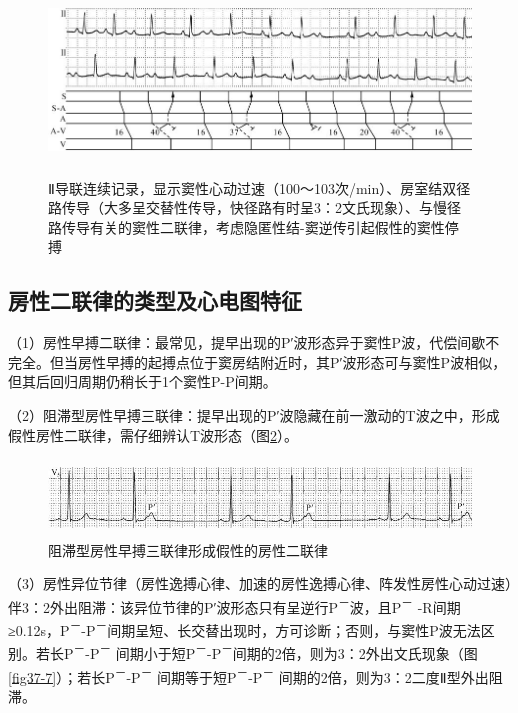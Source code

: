 \begin{figure}[!htbp]
 \centering
 \includegraphics[width=5.84375in,height=1.96875in]{./images/Image00599.jpg}
 \captionsetup{justification=centering}
 \caption{Ⅱ导联连续记录，显示窦性心动过速（100～103次/min）、房室结双径路传导（大多呈交替性传导，快径路有时呈3：2文氏现象）、与慢径路传导有关的窦性二联律，考虑隐匿性结-窦逆传引起假性的窦性停搏}
 \label{fig37-5}
  \end{figure} 

\protect\hypertarget{text00044.htmlux5cux23subid483}{}{}

\subsection{房性二联律的类型及心电图特征}

（1）房性早搏二联律：最常见，提早出现的P′波形态异于窦性P波，代偿间歇不完全。但当房性早搏的起搏点位于窦房结附近时，其P′波形态可与窦性P波相似，但其后回归周期仍稍长于1个窦性P-P间期。

（2）阻滞型房性早搏三联律：提早出现的P′波隐藏在前一激动的T波之中，形成假性房性二联律，需仔细辨认T波形态（图\ref{fig37-6}）。

\begin{figure}[!htbp]
 \centering
 \includegraphics[width=5.58333in,height=0.80208in]{./images/Image00600.jpg}
 \captionsetup{justification=centering}
 \caption{阻滞型房性早搏三联律形成假性的房性二联律}
 \label{fig37-6}
  \end{figure} 

（3）房性异位节律（房性逸搏心律、加速的房性逸搏心律、阵发性房性心动过速）伴3：2外出阻滞：该异位节律的P′波形态只有呈逆行P\textsuperscript{－}波，且P\textsuperscript{－} -R间期≥0.12s，P\textsuperscript{－}-P\textsuperscript{－}间期呈短、长交替出现时，方可诊断；否则，与窦性P波无法区别。若长P\textsuperscript{－}-P\textsuperscript{－} 间期小于短P\textsuperscript{－}-P\textsuperscript{－}间期的2倍，则为3：2外出文氏现象（图\ref{fig37-7}）；若长P\textsuperscript{－}-P\textsuperscript{－} 间期等于短P\textsuperscript{－}-P\textsuperscript{－} 间期的2倍，则为3：2二度Ⅱ型外出阻滞。

